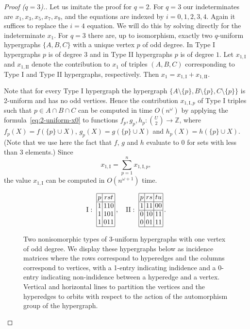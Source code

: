 \documentclass{amsart}
\begin{document}
\begin{proof}[Proof ($q=3$).]
Let us imitate the proof for $q=2$.
For $q=3$ our indeterminates are $x_1,x_3,x_5,x_7,x_9$, and the
equations are indexed by $i=0,1,2,3,4$. Again it suffices to replace
the $i=4$ equation. We will do this by solving directly for
the indeterminate $x_1$. For $q=3$ there are, up to isomorphism, 
exactly two $q$-uniform hypergraphs $\{A,B,C\}$ with a unique vertex $p$
of odd degree. 
In Type I hypergraphs $p$ is of degree $3$ and in Type II hypergraphs $p$ is of degree $1$. 
Let $x_{1,\mathrm{I}}$ and $x_{1,\mathrm{II}}$ denote the contribution to $x_1$ of triples $(A,B,C)$ corresponding to Type I and Type II hypergraphs, respectively.
Then $x_1=x_{1,\mathrm{I}}+x_{1,\mathrm{II}}$.

Note that for every Type I hypergraph the hypergraph $\{A\setminus\{p\},B\setminus\{p\},C\setminus\{p\}\}$ is 2-uniform and has no odd vertices.
Hence the contribution $x_{1,\mathrm{I},p}$ of Type I triples such that $p\in A\cap B\cap C$ can be computed in time $O(n^{\omega})$ by applying the formula~\eqref{eq:2-uniform-x0} to functions $f_p,g_p,h_p:{U\choose 2}\rightarrow \mathbb{Z}$, where $f_p(X)=f(\{p\}\cup X)$, $g_p(X)=g(\{p\}\cup X)$ and $h_p(X)=h(\{p\}\cup X)$. (Note that we use here the fact that $f$, $g$ and $h$ evaluate to $0$ for sets with less than 3 elements.)
Since \[x_{1,\mathrm{I}} = \sum_{p=1}^n x_{1,\mathrm{I},p},\]
the value $x_{1,\mathrm{I}}$ can be computed in $O(n^{\omega+1})$ time.

\begin{figure}[t]
\[
\mathrm{I}:\ 
\begin{array}{|@{\,}c@{\,}|@{\,}c@{\,}|}
\hline
p&rst\\
\hline
1&110\\
1&101\\
1&011\\
\hline
\end{array}\,,
\quad
\mathrm{II}:\ 
\begin{array}{|@{\,}c@{\,}|@{\,}c@{\,}|@{\,}c@{\,}|}
\hline
p&rs&tu\\
\hline
1&11&00\\\hline
0&10&11\\
0&01&11\\
\hline
\end{array}\,.
\]
\caption{\label{fig:3-uniform}Two nonisomorphic types of 3-uniform hypergraphs with one vertex of odd degree.
We display these hypergraphs below as incidence matrices
where the rows correspond to hyperedges and the columns correspond
to vertices, with a 1-entry indicating indidence and a 0-entry 
indicating non-indidence between a hyperedge and a vertex.
Vertical and horizontal lines to partition the vertices and 
the hyperedges to orbits with respect to the action of the automorphism 
group of the hypergraph.}
\end{figure}


\end{proof}
\end{document}
